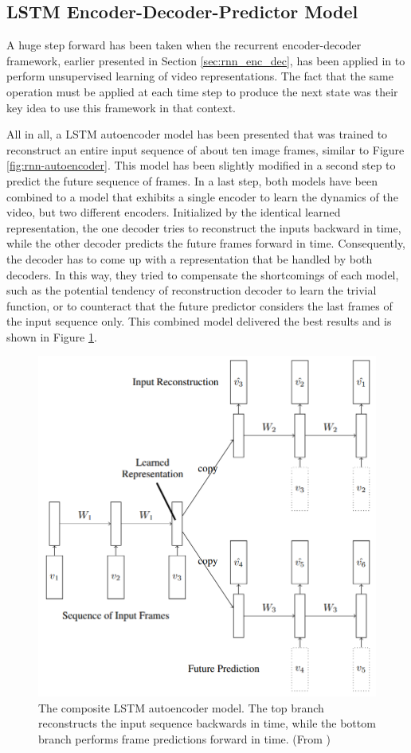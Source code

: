 \subsection{LSTM Encoder-Decoder-Predictor Model}

A huge step forward has been taken when the recurrent encoder-decoder framework, earlier presented in Section \ref{sec:rnn_enc_dec}, has been applied in \parencite{unsup_learn_lstm} to perform unsupervised learning of video representations. The fact that the same operation must be applied at each time step to produce the next state was their key idea to use this framework in that context. 

All in all, a LSTM autoencoder model has been presented that was trained to reconstruct an entire input sequence of about ten image frames, similar to Figure \ref{fig:rnn-autoencoder}. This model has been slightly modified in a second step to predict the future sequence of frames. In a last step, both models have been combined to a model that exhibits a single encoder to learn the dynamics of the video, but two different encoders. Initialized by the identical learned representation, the one decoder tries to reconstruct the inputs backward in time, while the other decoder predicts the future frames forward in time. Consequently, the decoder has to come up with a representation that be handled by both decoders. In this way, they tried to compensate the shortcomings of each model, such as the potential tendency of reconstruction decoder to learn the trivial function, or to counteract that the future predictor considers the last frames of the input sequence only. This combined model delivered the best results and is shown in Figure \ref{fig:lstm_combo}.

\begin{figure}[htb]
	\centering
	\includegraphics[width=0.5\linewidth]{figures/related/combo_shrinked.png} 
	\caption[Composite LSTM Autoencoder Model]{The composite LSTM autoencoder model. The top branch reconstructs the input sequence backwards in time, while the bottom branch performs frame predictions forward in time. (From \parencite{unsup_learn_lstm})} \label{fig:lstm_combo}
\end{figure}

